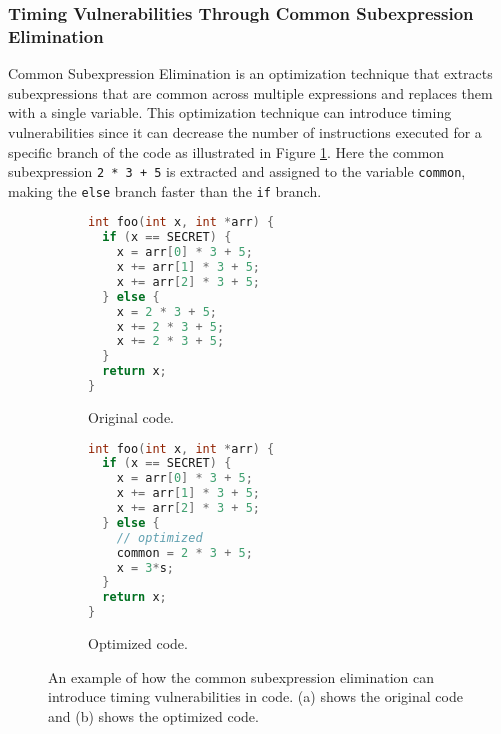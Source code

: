 \subsubsection{Timing Vulnerabilities Through Common Subexpression Elimination}
Common Subexpression Elimination is an optimization technique that extracts subexpressions that are common across multiple expressions and replaces them with a single variable.
This optimization technique can introduce timing vulnerabilities since it can decrease the number of instructions executed for a specific branch of the code as illustrated in Figure \ref{fig:common-subexpression-elimination}.
Here the common subexpression \texttt{2 * 3 + 5} is extracted and assigned to the variable \texttt{common}, making the \texttt{else} branch faster than the \texttt{if} branch.

\begin{figure}[H]
  \centering
     \begin{subfigure}[b]{0.3\textwidth}
        \begin{lstlisting}[style=defstyle, language=C]
int foo(int x, int *arr) {
  if (x == SECRET) {
    x = arr[0] * 3 + 5;
    x += arr[1] * 3 + 5;
    x += arr[2] * 3 + 5;
  } else {
    x = 2 * 3 + 5;
    x += 2 * 3 + 5;
    x += 2 * 3 + 5;
  }
  return x;
} \end{lstlisting} 
         \caption{Original code.}
    \end{subfigure}
    \hspace{1cm}
    \begin{subfigure}[b]{0.3\textwidth}
      \begin{lstlisting}[style=defstyle, language=C]
int foo(int x, int *arr) {
  if (x == SECRET) {
    x = arr[0] * 3 + 5;
    x += arr[1] * 3 + 5;
    x += arr[2] * 3 + 5;
  } else {
    // optimized
    common = 2 * 3 + 5;
    x = 3*s;
  }
  return x;
} \end{lstlisting} 
       \caption{Optimized code.}
  \end{subfigure}
  \caption{An example of how the common subexpression elimination can introduce timing vulnerabilities in code. (a) shows the original code and (b) shows the optimized code.}
  \label{fig:common-subexpression-elimination}
\end{figure}